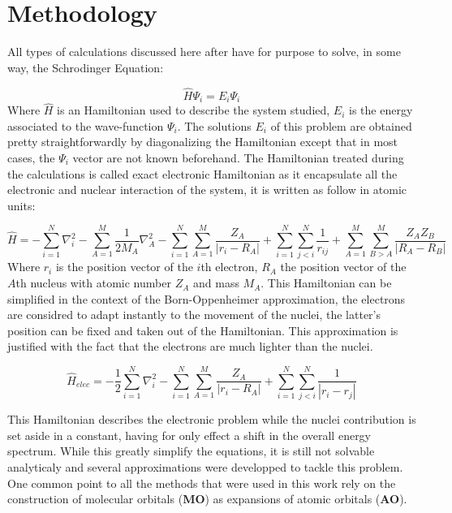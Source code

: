 \documentclass[10pt]{report}
\numberwithin{equation}{section}
\begin{document}
\section{Methodology}

All types of calculations discussed here after have for purpose to solve, in some way, the Schrodinger Equation:

\begin{equation}
    \hat{H}\Psi_i=E_i\Psi_i
\end{equation}
Where $\hat{H}$ is an Hamiltonian used to describe the system studied, $E_i$ is the energy associated to the wave-function $\Psi_i$. 
The solutions $E_i$ of this problem are obtained pretty straightforwardly by diagonalizing the Hamiltonian except that in most cases, the $\Psi_i$ vector are not known beforehand.
The Hamiltonian treated during the calculations is called exact electronic Hamiltonian as it encapsulate all the electronic and nuclear interaction of the system, it is written as follow in atomic units:

\begin{equation}
    \hat{H}=-\sum_{i=1}^{N}\nabla_i^2-\sum_{A=1}^{M}\frac{1}{2M_A}\nabla_A^2%
    -\sum_{i=1}^{N}\sum_{A=1}^{M}\frac{Z_A}{|r_i-R_A|}+\sum_{i=1}^{N}\sum_{j<i}^{N}\frac{1}{r_{ij}}%
    +\sum_{A=1}^{M}\sum_{B>A}^{M}\frac{Z_A Z_B}{|R_A-R_B|}
\end{equation}
Where $r_i$ is the position vector of the $i$th electron, $R_A$ the position vector of the $A$th nucleus with atomic number $Z_A$ and mass $M_A$.
This Hamiltonian can be simplified in the context of the Born-Oppenheimer approximation, the electrons are considred to adapt instantly to the movement of the nuclei, the latter's position can be fixed and taken out of the Hamiltonian.
This approximation is justified with the fact that the electrons are much lighter than the nuclei. 

\begin{equation}\label{Helec}
    \hat{H}_{elec}=-\frac{1}{2}\sum_{i=1}^{N}\nabla_i^2%
    -\sum_{i=1}^{N}\sum_{A=1}^{M}\frac{Z_A}{|r_i-R_A|}+\sum_{i=1}^{N}\sum_{j<i}^{N}\frac{1}{|r_i-r_j|}%
\end{equation}

This Hamiltonian describes the electronic problem while the nuclei contribution is set aside in a constant, having for only effect a shift in the overall energy spectrum. 
While this greatly simplify the equations, it is still not solvable analyticaly and several approximations were developped to tackle this problem. %
One common point to all the methods that were used in this work rely on the construction of molecular orbitals (\textbf{MO}) as expansions of atomic orbitals (\textbf{AO}).
\end{document}
